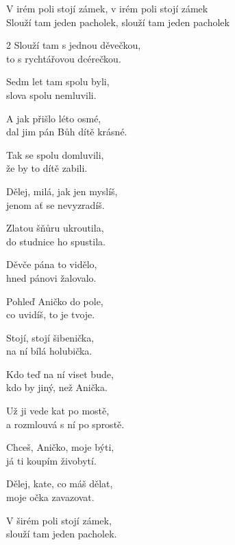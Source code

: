 
\ve{}
V irém poli stojí zámek, v irém poli stojí zámek\\
Slouží tam jeden pacholek, slouží tam jeden pacholek

\begin{multicols*}{2}
\ve{}
Slouží tam s jednou děvečkou,\\
to s rychtářovou dcérečkou.

\ve{}
Sedm let tam spolu byli,\\
slova spolu nemluvili.

\ve{}
A jak přišlo léto osmé,\\
dal jim pán Bůh dítě krásné.

\ve{}
Tak se spolu domluvili,\\
že by to dítě zabili.

\ve{}
Dělej, milá, jak jen myslíš,\\
jenom ať se nevyzradíš.

\ve{}
Zlatou šňůru ukroutila,\\
do studnice ho spustila.

\ve{}
Děvče pána to vidělo,\\
hned pánovi žalovalo.

\ve{}
Pohleď Aničko do pole,\\
co uvidíš, to je tvoje.

\ve{}
Stojí, stojí šibenička,\\
na ní bílá holubička.

\ve{}
Kdo teď na ní viset bude,\\
kdo by jiný, než Anička.

\ve{}
Už ji vede kat po mostě,\\
a rozmlouvá s ní po sprostě.

\ve{}
Chceš, Aničko, moje býti,\\
já ti koupím živobytí.

\ve{}
Dělej, kate, co máš dělat,\\
moje očka zavazovat.

\columnbreak
\vspace*{\fill}

\ve{}
V širém poli stojí zámek,\\
slouží tam jeden pacholek.

\end{multicols*}

\esong